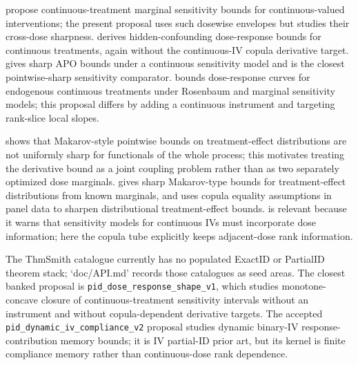 \documentclass[11pt]{article}
\theoremstyle{definition}
\theoremstyle{plain}
\theoremstyle{remark}
\begin{document}
\citet{JessonDouglasManshausenSolalMeinshausenStierGalShalit2022} propose continuous-treatment marginal sensitivity bounds for continuous-valued interventions; the present proposal uses such dosewise envelopes but studies their cross-dose sharpness.  \citet{MarmarelisHaddadJessonJahanshadGalstyanVerSteeg2023} derives hidden-confounding dose-response bounds for continuous treatments, again without the continuous-IV copula derivative target.  \citet{BaitairianSebastienJreichKatsahianGuilloux2025} gives sharp APO bounds under a continuous sensitivity model and is the closest pointwise-sharp sensitivity comparator.  \citet{DalalTchetgenTchetgen2025} bounds dose-response curves for endogenous continuous treatments under Rosenbaum and marginal sensitivity models; this proposal differs by adding a continuous instrument and targeting rank-slice local slopes.

\citet{FirpoRidder2019} shows that Makarov-style pointwise bounds on treatment-effect distributions are not uniformly sharp for functionals of the whole process; this motivates treating the derivative bound as a joint coupling problem rather than as two separately optimized dose marginals.  \citet{FanPark2010} gives sharp Makarov-type bounds for treatment-effect distributions from known marginals, and \citet{MadigasekaraPoskittZhangZhao2024} uses copula equality assumptions in panel data to sharpen distributional treatment-effect bounds.  \citet{BaiocchiChengSmall2023} is relevant because it warns that sensitivity models for continuous IVs must incorporate dose information; here the copula tube explicitly keeps adjacent-dose rank information.

The ThmSmith catalogue currently has no populated ExactID or PartialID theorem stack; `doc/API.md' records those catalogues as seed areas.  The closest banked proposal is \texttt{pid\_dose\_response\_shape\_v1}, which studies monotone-concave closure of continuous-treatment sensitivity intervals without an instrument and without copula-dependent derivative targets.  The accepted \texttt{pid\_dynamic\_iv\_compliance\_v2} proposal studies dynamic binary-IV response-contribution memory bounds; it is IV partial-ID prior art, but its kernel is finite compliance memory rather than continuous-dose rank dependence.
\end{document}
